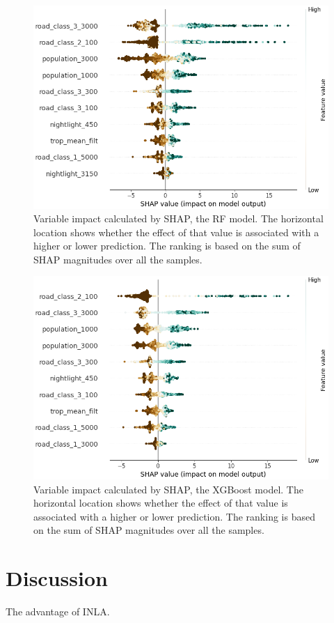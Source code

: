 \documentclass{article}
\begin{document}
\begin{figure}
\centering
\includegraphics[scale = 0.5]{fig/rfshap.png}
\caption{Variable impact calculated by SHAP, the RF model. The horizontal location shows whether the effect of that value is associated with a higher or lower prediction. The ranking is based on the sum of SHAP magnitudes over all the samples.}
\label{rfshap}
\end{figure}

\begin{figure}
\centering
\includegraphics[scale = 0.5]{fig/xgbshap.png}
\caption{Variable impact calculated by SHAP, the XGBoost model. The horizontal location shows whether the effect of that value is associated with a higher or lower prediction. The ranking is based on the sum of SHAP magnitudes over all the samples.}
\label{xgbshap}
\end{figure}


\section{Discussion}
The advantage of INLA.


\newpage


\end{document}
